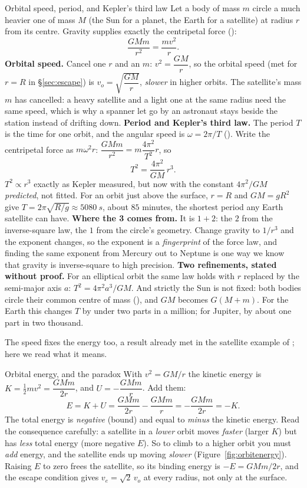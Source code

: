 \begin{derivbox}{Orbital speed, period, and Kepler's third law}
Let a body of mass $m$ circle a much heavier one of mass $M$ (the Sun for a planet, the Earth for a
satellite) at radius $r$ from its centre. Gravity supplies exactly the centripetal force ():
\[
\frac{GMm}{r^2}=\frac{mv^2}{r}.
\]
 \textbf{Orbital speed.} Cancel one $r$ and an $m$: $v^2=\dfrac{GM}{r}$, so the orbital speed
(met for $r=R$ in \S\ref{sec:escape}) is $v_o=\sqrt{\dfrac{GM}{r}}$, \emph{slower} in higher orbits. The satellite's mass $m$ has cancelled: a
heavy satellite and a light one at the same radius need the same speed, which is why a spanner let go
by an astronaut stays beside the station instead of drifting down.
 \textbf{Period and Kepler's third law.} The period $T$ is the time for one orbit, and the
angular speed is $\omega=2\pi/T$ (). Write the centripetal force as
$m\omega^2 r$: $\dfrac{GMm}{r^2}=m\dfrac{4\pi^2}{T^2}r$, so
\[
T^2=\frac{4\pi^2}{GM}\,r^3.
\]
$T^2\propto r^3$ exactly as Kepler measured, but now with the constant $4\pi^2/GM$ \emph{predicted},
not fitted. For an
orbit just above the surface, $r=R$ and $GM=gR^2$ give $T=2\pi\sqrt{R/g}\approx\SI{5080}{s}$, about
$85$ minutes, the shortest period any Earth satellite can have.
 \textbf{Where the 3 comes from.} It is $1+2$: the $2$ from the inverse-square law, the $1$ from
the circle's geometry. Change gravity to $1/r^3$ and the exponent changes, so the exponent is a
\emph{fingerprint} of the force law, and finding the same exponent from Mercury out to Neptune is one
way we know that gravity is inverse-square to high precision.
 \textbf{Two refinements, stated without proof.} For an elliptical orbit the same law holds with
$r$ replaced by the semi-major axis $a$: $T^2=4\pi^2a^3/GM$. And strictly the Sun is not fixed: both bodies
circle their common centre of mass (), and $GM$ becomes $G(M+m)$. For the Earth this changes
$T$ by under two parts in a million; for Jupiter, by about one part in two thousand.
\end{derivbox}

The speed fixes the energy too, a result already met in the satellite example of ;
here we read what it means.

\begin{derivbox}{Orbital energy, and the paradox}
With $v^2=GM/r$ the kinetic energy is $K=\tfrac12 mv^2=\dfrac{GMm}{2r}$, and $U=-\dfrac{GMm}{r}$. Add them:
\[
E=K+U=\frac{GMm}{2r}-\frac{GMm}{r}=-\frac{GMm}{2r}=-K.
\]
The total energy is \emph{negative} (bound) and equal to \emph{minus} the kinetic energy. Read the
consequence carefully: a satellite in a \emph{lower} orbit moves \emph{faster} (larger $K$) but has
\emph{less} total energy (more negative $E$). So to climb to a higher orbit you must \emph{add} energy,
and the satellite ends up moving \emph{slower} (Figure~\ref{fig:orbitenergy}). Raising $E$ to zero
frees the satellite, so its binding energy is $-E=GMm/2r$, and the escape condition gives
$v_e=\sqrt2\,v_o$ at every radius, not only at the surface.
\end{derivbox}

